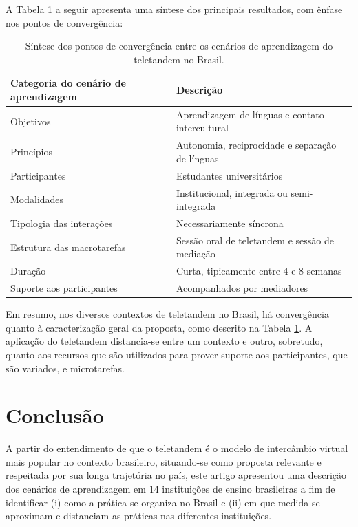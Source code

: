 \documentclass[portuguese]{textolivre}
\begin{document}
A Tabela \ref{quadro1} a seguir apresenta uma síntese dos principais resultados, com ênfase nos pontos de convergência:

\begin{table}[htpb]
  \centering
  \begin{threeparttable}
    \caption{Síntese dos pontos de convergência entre os cenários de aprendizagem do teletandem no Brasil.}\label{quadro1}
    \begin{tabular}{l l}
      \toprule 
      Categoria do cenário de aprendizagem & Descrição  \\ 
      \midrule
      Objetivos & Aprendizagem de línguas e contato intercultural\\ 
      Princípios & Autonomia, reciprocidade e separação de línguas \\  
      Participantes & Estudantes universitários \\
      Modalidades & Institucional, integrada ou semi-integrada\\
      Tipologia das interações & Necessariamente síncrona\\
      Estrutura das macrotarefas & Sessão oral de teletandem e sessão de mediação\\
      Duração & Curta, tipicamente entre 4 e 8 semanas \\
      Suporte aos participantes & Acompanhados por mediadores \\
      \bottomrule
      \end{tabular}
  \end{threeparttable}
\end{table}

Em resumo, nos diversos contextos de teletandem no Brasil, há convergência quanto à caracterização geral da proposta, como descrito na Tabela \ref{quadro1}. A aplicação do teletandem distancia-se entre um contexto e outro, sobretudo, quanto aos recursos que são utilizados para prover suporte aos participantes, que são variados, e microtarefas.

\section{Conclusão}\label{conclusao}

A partir do entendimento de que o teletandem é o modelo de intercâmbio virtual mais popular no contexto brasileiro, situando-se como proposta relevante e respeitada por sua longa trajetória no país, este artigo apresentou uma descrição dos cenários de aprendizagem em 14 instituições de ensino brasileiras a fim de identificar (i) como a prática se organiza no Brasil e (ii) em que medida se aproximam e distanciam as práticas nas diferentes instituições.
\end{document}

